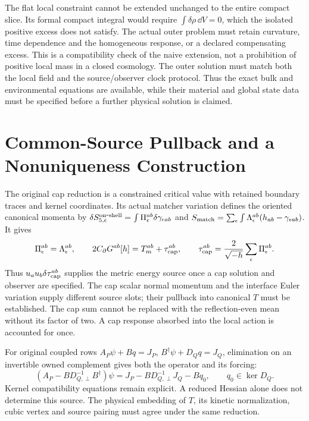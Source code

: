 The flat local constraint cannot be extended unchanged to the entire
compact slice. Its formal compact integral would require
$\int\delta\rho\,\dd V=0$, which the isolated positive excess does not
satisfy. The actual outer problem must retain curvature, time dependence
and the homogeneous response, or a declared compensating excess. This
is a compatibility check of the naive extension, not a prohibition of
positive local mass in a closed cosmology. The outer solution must match
both the local field and the source/observer clock protocol. Thus the
exact bulk and environmental equations are available, while their
material and global state data must be specified before a further
physical solution is claimed.

\section{Common-Source Pullback and a Nonuniqueness Construction}
\label{app:source-reduction}
The original cap reduction is a constrained critical value with retained
boundary traces and kernel coordinates. Its actual matcher variation
defines the oriented canonical momenta by
$\delta S_{5,\epsilon}^{\rm on\mbox{-}shell}
=\int\Pi_\epsilon^{ab}\delta\gamma_{\epsilon ab}$ and
$S_{\rm match}=\sum_\epsilon\int\Lambda_\epsilon^{ab}
(h_{ab}-\gamma_{\epsilon ab})$. It gives
\begin{equation}
 \Pi_\epsilon^{ab}=\Lambda_\epsilon^{ab},\qquad
 2C_\partial G^{ab}[h]=T_m^{ab}+\tau_{\rm cap}^{ab},\qquad
 \tau_{\rm cap}^{ab}=\frac2{\sqrt{-h}}\sum_\epsilon\Pi_\epsilon^{ab}.
 \label{eq:cap-source-pullback}
\end{equation}
Thus $u_a u_b\delta\tau_{\rm cap}^{ab}$ supplies the metric energy
source once a cap solution and observer are specified. The cap scalar
normal momentum and the interface Euler variation supply different
source slots; their pullback into canonical $T$ must be established.
The cap sum cannot be replaced with the reflection-even mean without
its factor of two. A cap response absorbed into the local action is
accounted for once.

For original coupled rows $A_P\psi+Bq=J_P$,
$B^\dagger\psi+D_Qq=J_Q$, elimination on an invertible owned complement
gives both the operator and its forcing:
\begin{equation}
 (A_P-BD_{Q,\perp}^{-1}B^\dagger)\psi
 =J_P-BD_{Q,\perp}^{-1}J_Q-Bq_0,
 \qquad q_0\in\ker D_Q.
 \label{eq:source-schur}
\end{equation}
Kernel compatibility equations remain explicit. A reduced Hessian
alone does not determine this source. The physical embedding of $T$,
its kinetic normalization, cubic vertex and source pairing must agree
under the same reduction.


